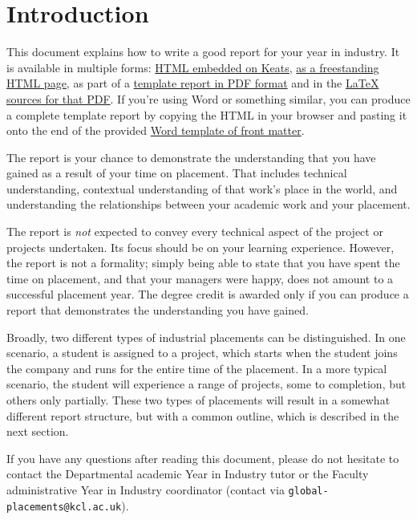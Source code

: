 \chapter{Introduction}

This document explains how to write a good report for your year in industry.
It is available in multiple forms:
\href{https://keats.kcl.ac.uk/course/view.php?id=75967&section=27}{HTML embedded on Keats},
\href{https://nms.kcl.ac.uk/stephen.kell/yini/report-keats.html}{as a freestanding HTML page},
as part of a \href{https://nms.kcl.ac.uk/stephen.kell/yini/report.pdf}{template report in PDF format}
and in the \href{https://nms.kcl.ac.uk/stephen.kell/yini/reportsrc.zip}{LaTeX sources for that PDF}.
If you're using Word or something similar,
you can produce a complete template report
by copying the HTML in your browser and pasting it onto the end of the provided
\href{https://nms.kcl.ac.uk/stephen.kell/yini/report-word-frontmatter.docx}{Word template of front matter}.

The report is your chance to demonstrate the understanding that you have gained as a result of your
time on placement. That includes technical understanding, contextual understanding of that work's
place in the world, and understanding the relationships between your academic work and your
placement.

The report is \emph{not} expected to convey every technical aspect of the project or projects undertaken.
Its focus should be on your learning experience. However, the report is not a formality;
simply being able to state that you have spent the time on placement, and that your managers were
happy, does not amount to a successful placement year. The degree credit is awarded only if you can
produce a report that demonstrates the understanding you have gained.

Broadly, two different types of industrial placements can be distinguished. In one scenario, a
student is assigned to a project, which starts when the student joins the company and runs for the
entire time of the placement. In a more typical scenario, the student will experience a range of
projects, some to completion, but others only partially. These two types of placements will result
in a somewhat different report structure, but with a common outline, which is described in the next
section.

\sloppypar{} If you have any questions after reading this document, please do not hesitate to contact the
Departmental academic Year in Industry tutor or the Faculty administrative Year in Industry
coordinator (contact via \texttt{global-placements@kcl.ac.uk}).
